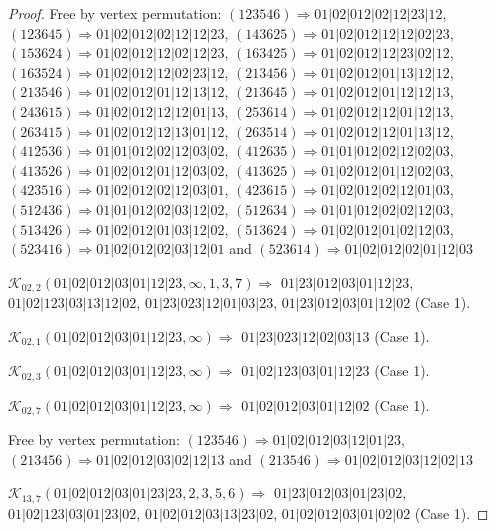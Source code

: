 \documentclass[12pt]{article}
\theoremstyle{plain}
\theoremstyle{definition}
\theoremstyle{remark}
\newcommand{\fancy}[1]{\mathcal{#1}}
\def\K{\fancy{K}}
\begin{document}
\begin{proof}
	
	
	Free by vertex permutation: $(1 2 3 5 4 6)\Rightarrow 01|02|012|02|12|23|12$, $(1 2 3 6 4 5)\Rightarrow 01|02|012|02|12|12|23$, $(1 4 3 6 2 5)\Rightarrow 01|02|012|12|12|02|23$, $(1 5 3 6 2 4)\Rightarrow 01|02|012|12|02|12|23$, $(1 6 3 4 2 5)\Rightarrow 01|02|012|12|23|02|12$, $(1 6 3 5 2 4)\Rightarrow 01|02|012|12|02|23|12$, $(2 1 3 4 5 6)\Rightarrow 01|02|012|01|13|12|12$, $(2 1 3 5 4 6)\Rightarrow 01|02|012|01|12|13|12$, $(2 1 3 6 4 5)\Rightarrow 01|02|012|01|12|12|13$, $(2 4 3 6 1 5)\Rightarrow 01|02|012|12|12|01|13$, $(2 5 3 6 1 4)\Rightarrow 01|02|012|12|01|12|13$, $(2 6 3 4 1 5)\Rightarrow 01|02|012|12|13|01|12$, $(2 6 3 5 1 4)\Rightarrow 01|02|012|12|01|13|12$, $(4 1 2 5 3 6)\Rightarrow 01|01|012|02|12|03|02$, $(4 1 2 6 3 5)\Rightarrow 01|01|012|02|12|02|03$, $(4 1 3 5 2 6)\Rightarrow 01|02|012|01|12|03|02$, $(4 1 3 6 2 5)\Rightarrow 01|02|012|01|12|02|03$, $(4 2 3 5 1 6)\Rightarrow 01|02|012|02|12|03|01$, $(4 2 3 6 1 5)\Rightarrow 01|02|012|02|12|01|03$, $(5 1 2 4 3 6)\Rightarrow 01|01|012|02|03|12|02$, $(5 1 2 6 3 4)\Rightarrow 01|01|012|02|02|12|03$, $(5 1 3 4 2 6)\Rightarrow 01|02|012|01|03|12|02$, $(5 1 3 6 2 4)\Rightarrow 01|02|012|01|02|12|03$, $(5 2 3 4 1 6)\Rightarrow 01|02|012|02|03|12|01$ and $(5 2 3 6 1 4)\Rightarrow 01|02|012|02|01|12|03$
	
	
	
	\bigskip
	
	$\K_{02,2}(01|02|012|03|01|12|23,\infty,1, 3, 7)\Rightarrow $ $01|23|012|03|01|12|23$, $01|02|123|03|13|12|02$, $01|23|023|12|01|03|23$, $01|23|012|03|01|12|02$ (Case 1).
	
	$\K_{02,1}(01|02|012|03|01|12|23,\infty)\Rightarrow $ $01|23|023|12|02|03|13$ (Case 1).
	
	$\K_{02,3}(01|02|012|03|01|12|23,\infty)\Rightarrow $ $01|02|123|03|01|12|23$ (Case 1).
	
	$\K_{02,7}(01|02|012|03|01|12|23,\infty)\Rightarrow $ $01|02|012|03|01|12|02$ (Case 1).
	
	
	
	Free by vertex permutation: $(1 2 3 5 4 6)\Rightarrow 01|02|012|03|12|01|23$, $(2 1 3 4 5 6)\Rightarrow 01|02|012|03|02|12|13$ and $(2 1 3 5 4 6)\Rightarrow 01|02|012|03|12|02|13$
	
	
	
	\bigskip
	
	$\K_{13,7}(01|02|012|03|01|23|23,2, 3, 5, 6)\Rightarrow $ $01|23|012|03|01|23|02$, $01|02|123|03|01|23|02$, $01|02|012|03|13|23|02$, $01|02|012|03|01|02|02$ (Case 1).
	

\end{proof}
\end{document}
